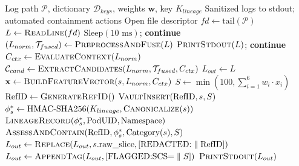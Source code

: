 \documentclass[conference]{IEEEtran}
\begin{document}
\begin{algorithm}[t]
\caption{In-Pod Stream Interception and Autonomous Containment}
\label{alg:interception}
\begin{algorithmic}[1]
\REQUIRE Log path $\mathcal{P}$, dictionary $\mathcal{D}_{keys}$, weights $\mathbf{w}$, key $K_{lineage}$
\ENSURE Sanitized logs to stdout; automated containment actions
\STATE Open file descriptor $fd \leftarrow \text{tail}(\mathcal{P})$
    \STATE $L \leftarrow \textsc{ReadLine}(fd)$
        \STATE $\text{Sleep}(10\text{ ms})$; \textbf{continue}
    \ENDIF
    \STATE $(L_{norm}, \mathcal{T}_{fused}) \leftarrow \textsc{PreprocessAndFuse}(L)$
        \STATE $\textsc{PrintStdout}(L)$; \textbf{continue}
    \ENDIF
    \STATE $C_{ctx} \leftarrow \textsc{EvaluateContext}(L_{norm})$
    \STATE $\mathcal{C}_{cand} \leftarrow \textsc{ExtractCandidates}(L_{norm}, \mathcal{T}_{fused}, C_{ctx})$
    \STATE $L_{out} \leftarrow L$
        \STATE $\mathbf{x} \leftarrow \textsc{BuildFeatureVector}(s, L_{norm}, C_{ctx})$
        \STATE $S \leftarrow \min(100, \sum_{i=1}^6 w_i \cdot x_i)$
            \STATE $\text{RefID} \leftarrow \textsc{GenerateRefID}()$
            \STATE $\textsc{VaultInsert}(\text{RefID}, s, S)$
            \STATE $\phi_s^* \leftarrow \text{HMAC-SHA256}(K_{lineage}, \textsc{Canonicalize}(s))$
                \STATE $\textsc{LineageRecord}(\phi_s^*, \text{PodUID}, \text{Namespace})$
                \STATE $\textsc{AssessAndContain}(\text{RefID}, \phi_s^*, \text{Category}(s), S)$
            \ENDIF
            \STATE $L_{out} \leftarrow \textsc{Replace}(L_{out}, s.\text{raw\_slice}, [\text{REDACTED:} \parallel \text{RefID}])$
            \STATE $L_{out} \leftarrow \textsc{AppendTag}(L_{out}, [\text{FLAGGED:SCS=} \parallel S])$
        \ENDIF
    \ENDFOR
    \STATE $\textsc{PrintStdout}(L_{out})$
\ENDWHILE
\end{algorithmic}
\end{algorithm}
\end{document}
